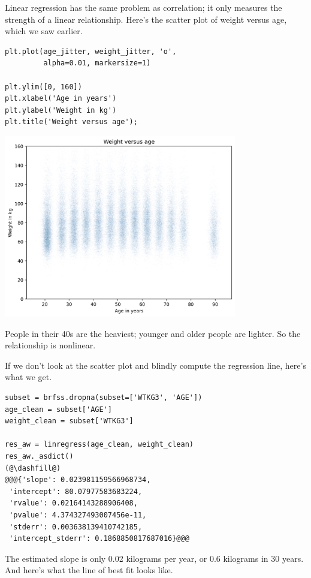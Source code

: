 Linear regression has the same problem as correlation; it only measures
the strength of a linear relationship. Here's the scatter plot of weight
versus age, which we saw earlier.

\begin{lstlisting}[]
plt.plot(age_jitter, weight_jitter, 'o', 
         alpha=0.01, markersize=1)

plt.ylim([0, 160])
plt.xlabel('Age in years')
plt.ylabel('Weight in kg')
plt.title('Weight versus age');
\end{lstlisting}

\begin{center}
\includegraphics[width=4in]{chapters/09_relationships_files/09_relationships_102_0.png}
\end{center}

People in their 40s are the heaviest; younger and older people are
lighter. So the relationship is nonlinear.

If we don't look at the scatter plot and blindly compute the regression
line, here's what we get.

\begin{lstlisting}[]
subset = brfss.dropna(subset=['WTKG3', 'AGE'])
age_clean = subset['AGE']
weight_clean = subset['WTKG3']

res_aw = linregress(age_clean, weight_clean)
res_aw._asdict()
(@\dashfill@)
@@@{'slope': 0.023981159566968734,
 'intercept': 80.07977583683224,
 'rvalue': 0.02164143288906408,
 'pvalue': 4.374327493007456e-11,
 'stderr': 0.003638139410742185,
 'intercept_stderr': 0.1868850817687016}@@@
\end{lstlisting}

The estimated slope is only 0.02 kilograms per year, or 0.6 kilograms in
30 years. And here's what the line of best fit looks like.

